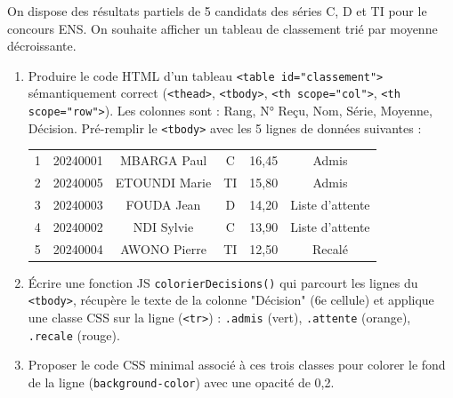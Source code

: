 \documentclass[11pt]{article}
\begin{document}
\begin{exercice}
On dispose des résultats partiels de 5 candidats des séries C, D et TI pour le concours ENS. On souhaite afficher un tableau de classement trié par moyenne décroissante.
\begin{enumerate}
    \item Produire le code HTML d'un tableau \texttt{<table id="classement">} sémantiquement correct (\texttt{<thead>}, \texttt{<tbody>}, \texttt{<th scope="col">}, \texttt{<th scope="row">}). Les colonnes sont : Rang, N° Reçu, Nom, Série, Moyenne, Décision. Pré-remplir le \texttt{<tbody>} avec les 5 lignes de données suivantes :
    \begin{center}
    \begin{tabular}{cccccc}
    1 & 20240001 & MBARGA Paul & C & 16,45 & Admis \\
    2 & 20240005 & ETOUNDI Marie & TI & 15,80 & Admis \\
    3 & 20240003 & FOUDA Jean & D & 14,20 & Liste d'attente \\
    4 & 20240002 & NDI Sylvie & C & 13,90 & Liste d'attente \\
    5 & 20240004 & AWONO Pierre & TI & 12,50 & Recalé
    \end{tabular}
    \end{center}
    \item Écrire une fonction JS \texttt{colorierDecisions()} qui parcourt les lignes du \texttt{<tbody>}, récupère le texte de la colonne "Décision" (6e cellule) et applique une classe CSS sur la ligne (\texttt{<tr>}) : \texttt{.admis} (vert), \texttt{.attente} (orange), \texttt{.recale} (rouge).
    \item Proposer le code CSS minimal associé à ces trois classes pour colorer le fond de la ligne (\texttt{background-color}) avec une opacité de 0,2.
\end{enumerate}
\end{exercice}
\end{document}
